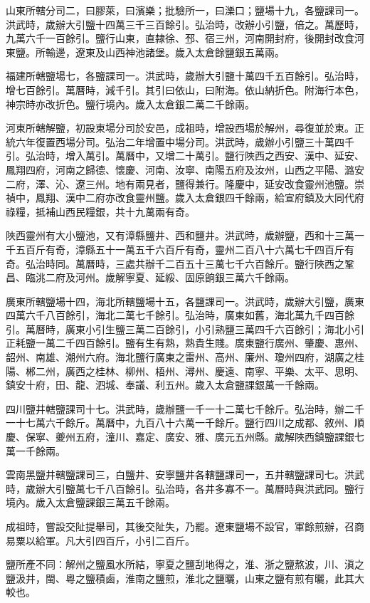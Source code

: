 山東所轄分司二，曰膠萊，曰濱樂；批驗所一，曰濼口；鹽場十九，各鹽課司一。洪武時，歲辦大引鹽十四萬三千三百餘引。弘治時，改辦小引鹽，倍之。萬歷時，九萬六千一百餘引。鹽行山東，直隸徐、邳、宿三州，河南開封府，後開封改食河東鹽。所輸邊，遼東及山西神池諸堡。歲入太倉餘鹽銀五萬兩。

福建所轄鹽場七，各鹽課司一。洪武時，歲辦大引鹽十萬四千五百餘引。弘治時，增七百餘引。萬曆時，減千引。其引曰依山，曰附海。依山納折色。附海行本色，神宗時亦改折色。鹽行境內。歲入太倉銀二萬二千餘兩。

河東所轄解鹽，初設東場分司於安邑，成祖時，增設西場於解州，尋復並於東。正統六年復置西場分司。弘治二年增置中場分司。洪武時，歲辦小引鹽三十萬四千引。弘治時，增入萬引。萬曆中，又增二十萬引。鹽行陜西之西安、漢中、延安、鳳翔四府，河南之歸德、懷慶、河南、汝寧、南陽五府及汝州，山西之平陽、潞安二府，澤、沁、遼三州。地有兩見者，鹽得兼行。隆慶中，延安改食靈州池鹽。崇禎中，鳳翔、漢中二府亦改食靈州鹽。歲入太倉銀四千餘兩，給宣府鎮及大同代府祿糧，抵補山西民糧銀，共十九萬兩有奇。

陜西靈州有大小鹽池，又有漳縣鹽井、西和鹽井。洪武時，歲辦鹽，西和十三萬一千五百斤有奇，漳縣五十一萬五千六百斤有奇，靈州二百八十六萬七千四百斤有奇。弘治時同。萬曆時，三處共辦千二百五十三萬七千六百餘斤。鹽行陜西之鞏昌、臨洮二府及河州。歲解寧夏、延綏、固原餉銀三萬六千餘兩。

廣東所轄鹽場十四，海北所轄鹽場十五，各鹽課司一。洪武時，歲辦大引鹽，廣東四萬六千八百餘引，海北二萬七千餘引。弘治時，廣東如舊，海北萬九千四百餘引。萬曆時，廣東小引生鹽三萬二百餘引，小引熟鹽三萬四千六百餘引；海北小引正耗鹽一萬二千四百餘引。鹽有生有熟，熟貴生賤。廣東鹽行廣州、肇慶、惠州、韶州、南雄、潮州六府。海北鹽行廣東之雷州、高州、廉州、瓊州四府，湖廣之桂陽、郴二州，廣西之桂林、柳州、梧州、潯州、慶遠、南寧、平樂、太平、思明、鎮安十府，田、龍、泗城、奉議、利五州。歲入太倉鹽課銀萬一千餘兩。

四川鹽井轄鹽課司十七。洪武時，歲辦鹽一千一十二萬七千餘斤。弘治時，辦二千一十七萬六千餘斤。萬曆中，九百八十六萬一千餘斤。鹽行四川之成都、敘州、順慶、保寧、夔州五府，潼川、嘉定、廣安、雅、廣元五州縣。歲解陜西鎮鹽課銀七萬一千餘兩。

雲南黑鹽井轄鹽課司三，白鹽井、安寧鹽井各轄鹽課司一，五井轄鹽課司七。洪武時，歲辦大引鹽萬七千八百餘引。弘治時，各井多寡不一。萬曆時與洪武同。鹽行境內。歲入太倉鹽課銀三萬五千餘兩。

成祖時，嘗設交阯提舉司，其後交阯失，乃罷。遼東鹽場不設官，軍餘煎辦，召商易粟以給軍。凡大引四百斤，小引二百斤。

鹽所產不同：解州之鹽風水所結，寧夏之鹽刮地得之，淮、浙之鹽熬波，川、滇之鹽汲井，閩、粵之鹽積鹵，淮南之鹽煎，淮北之鹽曬，山東之鹽有煎有曬，此其大較也。

